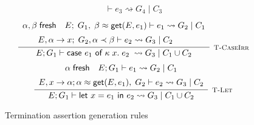 \begin{figure}
\[{\begin{array}{c}
                    \vdash e_3 \rightsquigarrow G_4\; |\; C_3
            \end{array}
        }
    \]
    \vspace{0.5pt}
    \[
        \infer[\textsc{\footnotesize T-CaseIrr}]{
            E; G_1 \vdash \textsf{case } e_1 \textsf{ of } \kappa\; x.\; e_2\; 
                \rightsquigarrow G_3\; |\; C_1 \cup C_2
        }{
            \begin{array}{c}
                \alpha, \beta\; \textsf{fresh}
                \hspace{1em}
                E;\; G_1,\; \beta \teq \textsf{get}(E, e_1)  \vdash e_1 
                    \rightsquigarrow G_2\; |\; C_1 \\[5pt]
                E, \alpha \rightarrow x;\; G_2, \alpha \tlt \beta 
                    \vdash e_2 \rightsquigarrow G_3\; |\; C_2
                \hspace{2em}
            \end{array}
        }
    \]
    \vspace{0.5pt}
    \[
        \infer[\textsc{\footnotesize T-Let}]{
            E; G_1 \vdash \textsf{let } x = e_1 \textsf{ in } e_2
                \rightsquigarrow G_3\; |\; C_1 \cup C_2
        }{
            \begin{array}{c}
                \alpha \; \textsf{fresh}
                \hspace{1em}
                E; G_1 \vdash e_1 \rightsquigarrow G_2\; |\; C_1 \\[5pt]
                E, x \rightarrow \alpha; \alpha \teq \textsf{get}(E, e_1),\; G_2 \vdash e_2 
                    \rightsquigarrow G_3\; |\; C_2
            \end{array}
        }
    \]
    \caption{Termination assertion generation rules}
    \label{fig:terminationassertiongen}
\end{figure}

